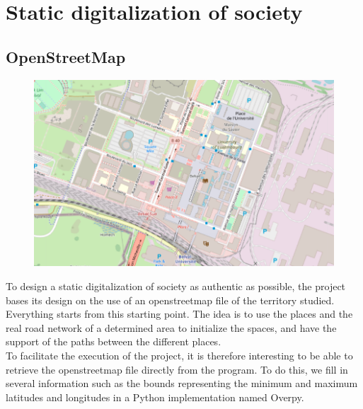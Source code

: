 \chapter{Static digitalization of society}

\section{OpenStreetMap}

\begin{figure}[h]
  \centering
  \includegraphics[width=0.8\linewidth]{Media/BelvalOSM.png}
  \caption{}
  \label{fig:belvalosm}
\end{figure}

To design a static digitalization of society as authentic as possible, the project bases its design on the use of an openstreetmap file of the territory studied. Everything starts from this starting point. The idea is to use the places and the real road network of a determined area to initialize the spaces, and have the support of the paths between the different places.\\

To facilitate the execution of the project, it is therefore interesting to be able to retrieve the openstreetmap file directly from the program. To do this, we fill in several information such as the bounds representing the minimum and maximum latitudes and longitudes in a Python implementation named Overpy.\\

